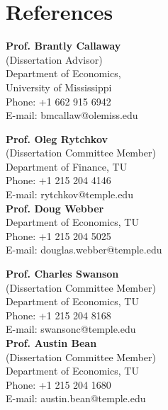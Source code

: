 \documentclass[12pt,letterpaper]{article}
\begin{document}
\section*{References}
\vspace{-.15in}
\begin{multicols}{2}
	
	\textbf{Prof. Brantly Callaway} \\
	(Dissertation Advisor)\\
	Department of Economics, \\
	University of Mississippi \\
	\hfill {Phone: +1 662 915 6942}\\
	\hfill{E-mail: {\color{blue}bmcallaw@olemiss.edu}}
	
	\vspace{.2in}
	
	\textbf{Prof. Oleg Rytchkov}\\
	(Dissertation Committee Member)\\
	Department of Finance, TU\\
	\hfill Phone: +1 215 204 4146\\
	\hfill{E-mail: {\color{blue}rytchkov@temple.edu}}\\

\textbf{Prof. Doug Webber} \\
Department of Economics, TU \\
\hfill{Phone: +1 215 204 5025} \\
\hfill{E-mail: {\color{blue}douglas.webber@temple.edu}}\\

		\columnbreak
		
		\textbf{Prof. Charles Swanson} \\
	(Dissertation Committee Member)\\
	Department of Economics, TU \\
	\hfill {Phone: +1 215 204 8168}\\
	\hfill{E-mail: {\color{blue}swansonc@temple.edu}}\\
	
	\vspace{.2in}
	\textbf{Prof. Austin Bean} \\
	(Dissertation Committee Member)\\
	Department of Economics, TU \\
	\hfill {Phone: +1 215 204 1680}\\
	\hfill{E-mail: {\color{blue}austin.bean@temple.edu}}\\	



\end{multicols}
\end{document}
